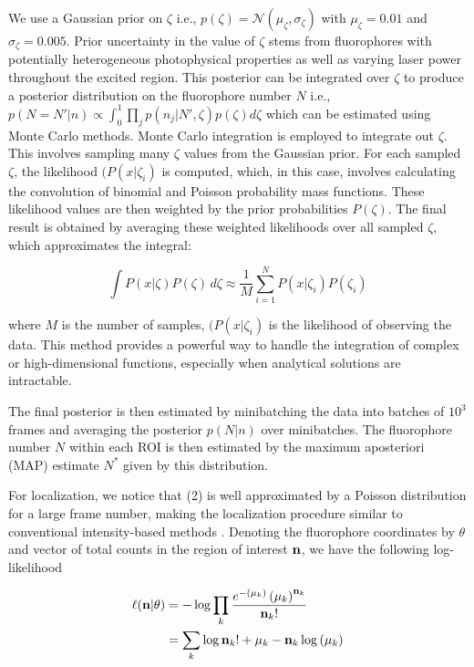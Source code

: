We use a Gaussian prior on $\zeta$ i.e., $p(\zeta) = \mathcal{N}(\mu_{\zeta},\sigma_{\zeta})$ with $\mu_{\zeta}=0.01$ and $\sigma_{\zeta}=0.005$. Prior uncertainty in the value of $\zeta$ stems from fluorophores with potentially heterogeneous photophysical properties as well as varying laser power throughout the excited region. This posterior can be integrated over $\zeta$ to produce a posterior distribution on the fluorophore number $N$ i.e., $p(N=N'\lvert n) \propto \int_{0}^{1} \prod_{j} p(n_{j}\lvert N',\zeta)p(\zeta) d\zeta$ which can be estimated using Monte Carlo methods. Monte Carlo integration is employed to integrate out $\zeta$. This involves sampling many $\zeta$ values from the Gaussian prior. For each sampled $\zeta$, the likelihood $(P(x\lvert\zeta_i)$ is computed, which, in this case, involves calculating the convolution of binomial and Poisson probability mass functions. These likelihood values are then weighted by the prior probabilities $P(\zeta)$. The final result is obtained by averaging these weighted likelihoods over all sampled $\zeta$, which approximates the integral:

\begin{equation*}
\int P(x\lvert\zeta) P(\zeta) \, d\zeta \approx \frac{1}{M} \sum_{i=1}^N P(x\lvert\zeta_i) P(\zeta_i)
\end{equation*}

where $M$ is the number of samples, $(P(x\lvert\zeta_i)$ is the likelihood of observing the data. This method provides a powerful way to handle the integration of complex or high-dimensional functions, especially when analytical solutions are intractable.


 The final posterior is then estimated by minibatching the data into batches of $10^3$ frames and averaging the posterior $p(N\lvert n)$ over minibatches. The fluorophore number $N$ within each ROI is then estimated by the maximum aposteriori (MAP) estimate $N^{*}$ given by this distribution.

For localization, we notice that (2) is well approximated by a Poisson distribution for a large frame number, making the localization procedure similar to conventional intensity-based methods \parencite{Smith2010}. Denoting the fluorophore coordinates by $\theta$ and vector of total counts in the region of interest $\bold{n}$, we have the following log-likelihood


\begin{align}
\ell(\bold{n}\lvert \theta) &= -\log \prod_{k} \frac{e^{-\left(\mu_{k}\right)}\left(\mu_{k}\right)^{\bold{n}_k}}{\bold{n}_k!}\\
&= \sum_{k}  \log \bold{n}_k! + \mu_{k} - \bold{n}_k\log\left(\mu_{k}\right)
\end{align}

